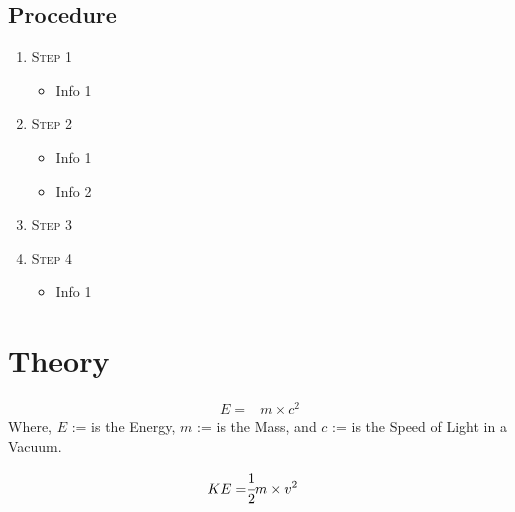 \documentclass[12pt, letterpaper]{article}
\begin{document}
		\subsection{Procedure}\hspace{2.6ex}
			\lipsum[13-15] %
			\begin{enumerate}
				\item
				{
					\textsc{Step 1}
					\begin{itemize}
						\item Info 1
					\end{itemize}
				}
				\item
				{
					\textsc{Step 2}
					\begin{itemize}
						\item Info 1
						\item Info 2
					\end{itemize}
				}
				\item
				{
					\textsc{Step 3}
				}
				\item
				{
					\textsc{Step 4}
					\begin{itemize}
						\item Info 1
					\end{itemize}
				}
			\end{enumerate}
            
	\section{Theory}\hspace{2.6ex}
		\label{}
		\lipsum[3] %
		
		\begin{align} %
			\label{eq:eg1} E = & m\times c^2
		\end{align}
		\newline Where, \newline
		\indent \(E\) := is the Energy,\newline
		\indent \(m\) := is the Mass, and \newline
		\indent \(c\) := is the Speed of Light in a Vacuum.

	\begin{align*} %
		KE = & \cfrac{1}{2}m\times v^2
	\end{align*}
	
\end{document}
